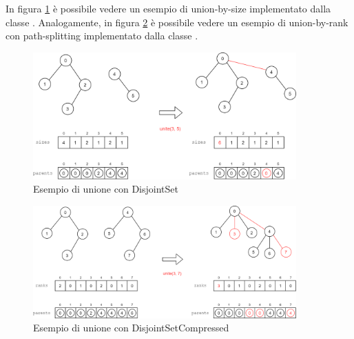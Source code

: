 \noindent In figura \ref{fig:disjoint-set-union-example} è possibile vedere un esempio di union-by-size implementato dalla classe . Analogamente, in figura \ref{fig:disjoint-set-compressed-union-example} è possibile vedere un esempio di union-by-rank con path-splitting implementato dalla classe .

\begin{figure}[h]
	\centering
	\includegraphics[width=0.9\textwidth]{./images/DisjointSetExample.png}
	\caption{Esempio di unione con DisjointSet}
	\label{fig:disjoint-set-union-example}
\end{figure}

\begin{figure}[h]
	\centering
	\includegraphics[width=0.9\textwidth]{./images/DisjointSetCompressedExample.png}
	\caption{Esempio di unione con DisjointSetCompressed}
	\label{fig:disjoint-set-compressed-union-example}
\end{figure}
